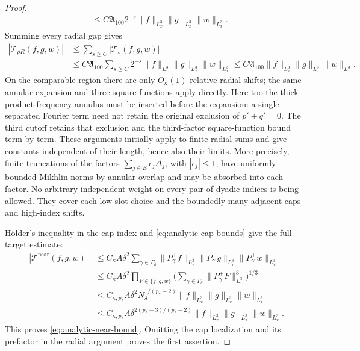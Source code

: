 \documentclass[11pt,a4paper]{article}
\numberwithin{equation}{section}
\theoremstyle{definition}
\begin{document}
\begin{proof}
\begin{equation*}
\begin{aligned}
&\leq C\mathfrak A_{100}2^{-s}
 \|f\|_{L^3_x}\|g\|_{L^3_x}\|w\|_{L^3_x}.
\end{aligned}
\end{equation*}
Summing every radial gap gives
\begin{equation*}
\begin{aligned}
|\mathcal T_{\rho R}(f,g,w)|
&\leq\sum_{s\geq C}|\mathcal T_s(f,g,w)|\\
&\leq C\mathfrak A_{100}\sum_{s\geq C}2^{-s}
 \|f\|_{L^3_x}\|g\|_{L^3_x}\|w\|_{L^3_x}
 \leq C\mathfrak A_{100}\|f\|_{L^3_x}\|g\|_{L^3_x}\|w\|_{L^3_x}.
\end{aligned}
\end{equation*}
On the comparable
region there are only $O_\kappa(1)$ relative radial shifts; the same
annular expansion and three square functions apply directly. Here too
the thick product-frequency annulus must be inserted before the expansion: a
single separated Fourier term need not retain the original exclusion
of $p'+q'=0$. The third cutoff retains that exclusion and the third-factor
square-function bound term by term. These
arguments initially apply to finite radial sums and give constants
independent of their length, hence also their limits. More precisely,
finite truncations of the factors $\sum_{j\in E}\epsilon_j\Delta_j$, with
$|\epsilon_j|\leq1$, have uniformly bounded Mikhlin norms by annular
overlap and may be absorbed into each factor. No arbitrary independent
weight on every pair of dyadic indices is being allowed. They cover each
low-slot choice and the boundedly many adjacent caps and high-index shifts.

H\"older's inequality in the cap index and \eqref{eq:analytic-cap-bounds}
give the full target estimate:
\begin{equation*}
\begin{aligned}
|\mathcal T^{\mathrm{near}}(f,g,w)|
&\leq C_\kappa A\delta^2\sum_{\gamma\in\Gamma_\delta}
 \|P_\gamma^+f\|_{L^3_x}\|P_\gamma^+g\|_{L^3_x}\|P_\gamma^+w\|_{L^3_x}\\
&\leq C_\kappa A\delta^2
 \prod_{F\in\{f,g,w\}}\bigg(\sum_{\gamma\in\Gamma_\delta}
                    \|P_\gamma^+F\|_{L^3_x}^3\bigg)^{1/3}\\
&\leq C_{\kappa,p_*}A\delta^2N_\delta^{1/(p_*-2)}
       \|f\|_{L^3_x}\|g\|_{L^3_x}\|w\|_{L^3_x}\\
&\leq C_{\kappa,p_*}A\delta^{2(p_*-3)/(p_*-2)}
       \|f\|_{L^3_x}\|g\|_{L^3_x}\|w\|_{L^3_x}.
\end{aligned}
\end{equation*}
This proves \eqref{eq:analytic-near-bound}. Omitting the cap localization
and its prefactor in the radial argument proves the first assertion.
\end{proof}
\end{document}
